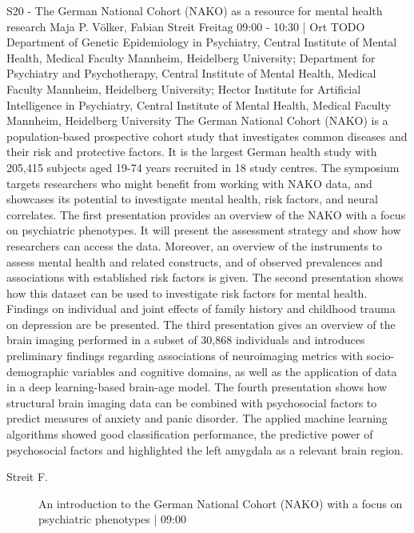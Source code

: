 
            \begin{symposium}
            {S20 - The German National Cohort (NAKO) as a resource for mental health research}
            {Maja P. Völker, Fabian Streit}
            {Freitag 09:00 - 10:30 | Ort TODO}
            {Department of Genetic Epidemiology in Psychiatry, Central Institute of Mental Health, Medical Faculty Mannheim, Heidelberg University; Department for Psychiatry and Psychotherapy, Central Institute of Mental Health, Medical Faculty Mannheim, Heidelberg University; Hector Institute for Artificial Intelligence in Psychiatry, Central Institute of Mental Health, Medical Faculty Mannheim, Heidelberg University}
            The German National Cohort (NAKO) is a population-based prospective cohort study that investigates common diseases and their risk and protective factors. It is the largest German health study with 205,415 subjects aged 19-74 years recruited in 18 study centres. The symposium targets researchers who might benefit from working with NAKO data, and showcases its potential to investigate mental health, risk factors, and neural correlates. The first presentation provides an overview of the NAKO with a focus on psychiatric phenotypes. It will present the assessment strategy and show how researchers can access the data. Moreover, an overview of the instruments to assess mental health and related constructs, and of observed prevalences and associations with established risk factors is given. The second presentation shows how this dataset can be used to investigate risk factors for mental health. Findings on individual and joint effects of family history and childhood trauma on depression are be presented. The third presentation gives an overview of the brain imaging performed in a subset of 30,868 individuals and introduces preliminary findings regarding associations of neuroimaging metrics with socio-demographic variables and cognitive domains, as well as the application of data in a deep learning-based brain-age model. The fourth presentation shows how structural brain imaging data can be combined with psychosocial factors to predict measures of anxiety and panic disorder. The applied machine learning algorithms showed good classification performance, the predictive power of psychosocial factors and highlighted the left amygdala as a relevant brain region.
            \begin{description}    
            
                \item [ Streit F.] An introduction to the German National Cohort (NAKO) with a focus on psychiatric phenotypes \textcolor{mygray}{ | 09:00}    
                

\end{description}
\end{symposium}
